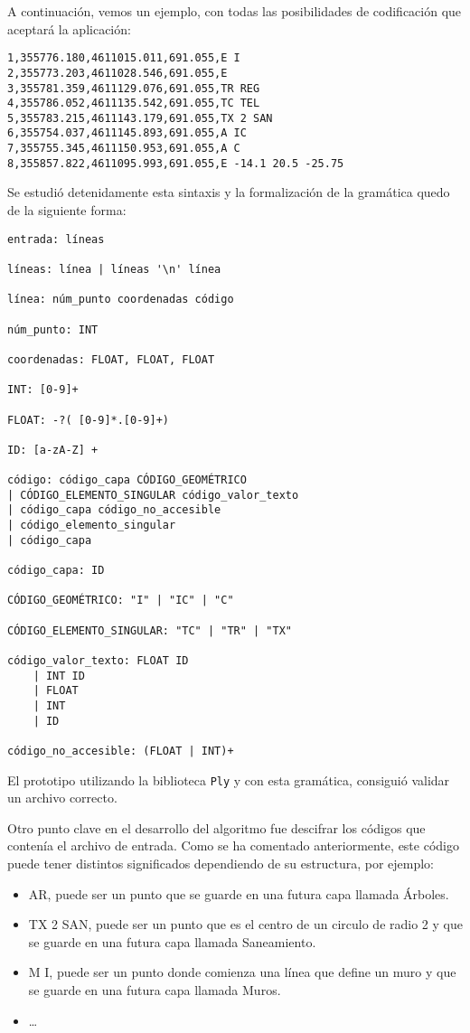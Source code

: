 A continuación, vemos un ejemplo, con todas las posibilidades de codificación que aceptará la aplicación: 
\begin{verbatim}
1,355776.180,4611015.011,691.055,E I
2,355773.203,4611028.546,691.055,E
3,355781.359,4611129.076,691.055,TR REG
4,355786.052,4611135.542,691.055,TC TEL
5,355783.215,4611143.179,691.055,TX 2 SAN
6,355754.037,4611145.893,691.055,A IC
7,355755.345,4611150.953,691.055,A C
8,355857.822,4611095.993,691.055,E -14.1 20.5 -25.75
\end{verbatim}

Se estudió detenidamente esta sintaxis y la formalización de la gramática quedo de la siguiente forma:

\begin{verbatim}
entrada: líneas

líneas: línea | líneas '\n' línea

línea: núm_punto coordenadas código

núm_punto: INT

coordenadas: FLOAT, FLOAT, FLOAT

INT: [0-9]+

FLOAT: -?( [0-9]*.[0-9]+)

ID: [a-zA-Z] +

código: código_capa CÓDIGO_GEOMÉTRICO
| CÓDIGO_ELEMENTO_SINGULAR código_valor_texto
| código_capa código_no_accesible
| código_elemento_singular
| código_capa

código_capa: ID

CÓDIGO_GEOMÉTRICO: "I" | "IC" | "C"

CÓDIGO_ELEMENTO_SINGULAR: "TC" | "TR" | "TX"

código_valor_texto: FLOAT ID
    | INT ID
    | FLOAT
    | INT
    | ID
    
código_no_accesible: (FLOAT | INT)+
\end{verbatim}

El prototipo utilizando la biblioteca \texttt{Ply} y con esta gramática,  consiguió validar un archivo correcto.

Otro punto clave en el desarrollo del algoritmo fue descifrar los códigos que contenía el archivo de entrada. Como se ha comentado anteriormente, este código puede tener distintos significados dependiendo de su estructura, por ejemplo:

\begin{itemize}
\item AR, puede ser un punto que se guarde en una futura capa llamada Árboles.
\item TX 2 SAN, puede ser un punto que es el centro de un circulo de radio 2 y que se guarde en una futura capa llamada Saneamiento.
\item M I, puede ser un punto donde comienza una línea que define un muro y que se guarde en una futura capa llamada Muros.
\item …
\end{itemize}

